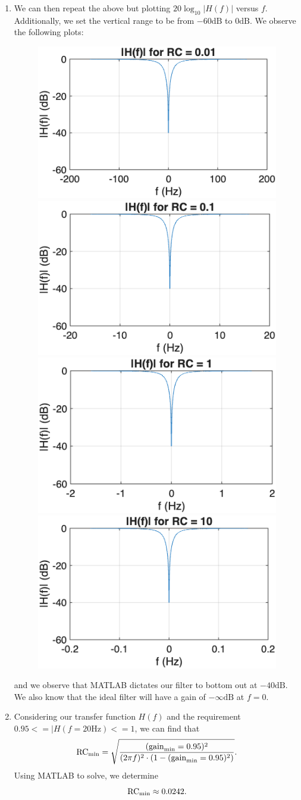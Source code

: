 \documentclass[11pt]{article}
\begin{document}
\begin{enumerate}[label=\textbf{\alph*)}, leftmargin=2.6em]
    \item We can then repeat the above but plotting $20\log_{10} |H(f)|$ versus $f$.
    Additionally, we set the vertical range to be from $-60\text{dB}$ to $0\text{dB}$. We observe the following plots:
    \begin{figure} [H]
        \centering
        \includegraphics[width=0.4\linewidth]{plot6.png}
        \includegraphics[width=0.4\linewidth]{plot7.png}
        \includegraphics[width=0.4\linewidth]{plot8.png}
        \includegraphics[width=0.4\linewidth]{plot9.png}
    \end{figure}
    and we observe that MATLAB dictates our filter to bottom out at $-40\text{dB}$. We
    also know that the ideal filter will have a gain of $-\infty\text{dB}$ at $f=0$.

    \item Considering our transfer function $H(f)$ and the requirement $0.95<=|H(f=20\text{Hz})<=1$, 
    we can find that
    \begin{equation} \notag
        \text{RC}_{\text{min}} = \sqrt{\frac{(\text{gain}_\text{min}=0.95)^2}{(2\pi f)^2 \cdot (1-(\text{gain}_\text{min}=0.95)^2)}}.
    \end{equation}
    Using MATLAB to solve, we determine
    \begin{equation} \notag
        \text{RC}_{\text{min}} \approx 0.0242.
    \end{equation}
\end{enumerate}
\end{document}
